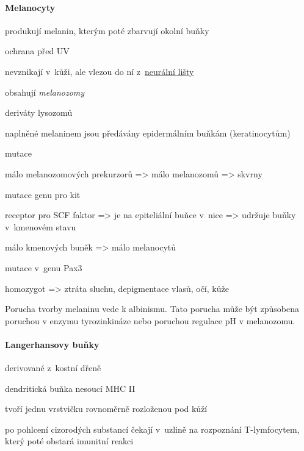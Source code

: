\documentclass[DIV=8]{scrreprt}
\begin{document}

\paragraph{Melanocyty}
\begin{myItemize}[nosep]
    \item produkují melanin, kterým poté zbarvují okolní buňky
    \item ochrana před UV
    \item nevznikají v kůži, ale vlezou do ní z \hyperref[Nervové buňky]{neurální lišty}
    \item obsahují \emph{melanozomy}
\begin{myItemize}[nosep]
    \item deriváty lysozomů
    \item naplněné melaninem jsou předávány epidermálním buňkám (keratinocytům)
\end{myItemize}

    \item mutace
\begin{myItemize}[nosep]
    \item málo melanozomových prekurzorů => málo melanozomů => skvrny
    \item mutace genu pro kit
\begin{myItemize}[nosep]
    \item receptor pro SCF faktor => je na epiteliální buňce v nice => udržuje buňky                     v kmenovém stavu
    \item málo kmenových buněk => málo melanocytů
\end{myItemize}

    \item mutace v genu Pax3
\begin{myItemize}[nosep]
    \item homozygot => ztráta sluchu, depigmentace vlasů, očí, kůže
\end{myItemize}

\end{myItemize}

\end{myItemize}



Porucha tvorby melaninu vede k albinismu. Tato porucha může být způsobena poruchou v enzymu tyrozinkináze nebo poruchou regulace pH v melanozomu.

\paragraph{Langerhansovy buňky}
\begin{myItemize}[nosep]
    \item derivované z kostní dřeně
    \item dendritická buňka nesoucí MHC II
    \item tvoří jednu vrstvičku rovnoměrně rozloženou pod kůží
    \item po pohlcení cizorodých substancí čekají v uzlině na rozpoznání T-lymfocytem, který poté obstará imunitní reakci
\end{myItemize}
\end{document}

